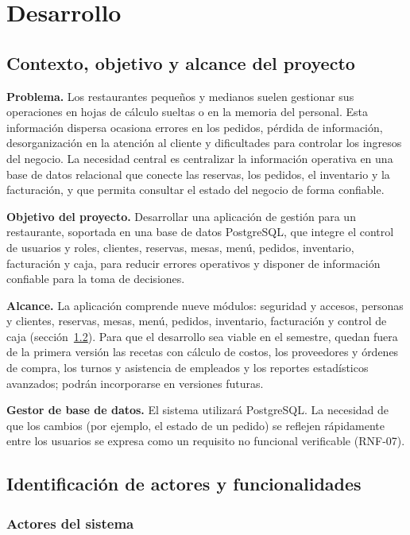 \documentclass[12pt,a4paper,oneside]{article}
\begin{document}
\section{Desarrollo}
\subsection{Contexto, objetivo y alcance del proyecto}

\textbf{Problema.} Los restaurantes pequeños y medianos suelen gestionar sus operaciones en hojas de cálculo sueltas o en la memoria del personal. Esta información dispersa ocasiona errores en los pedidos, pérdida de información, desorganización en la atención al cliente y dificultades para controlar los ingresos del negocio. La necesidad central es centralizar la información operativa en una base de datos relacional que conecte las reservas, los pedidos, el inventario y la facturación, y que permita consultar el estado del negocio de forma confiable.

\textbf{Objetivo del proyecto.} Desarrollar una aplicación de gestión para un restaurante, soportada en una base de datos PostgreSQL, que integre el control de usuarios y roles, clientes, reservas, mesas, menú, pedidos, inventario, facturación y caja, para reducir errores operativos y disponer de información confiable para la toma de decisiones.

\textbf{Alcance.} La aplicación comprende nueve módulos: seguridad y accesos, personas y clientes, reservas, mesas, menú, pedidos, inventario, facturación y control de caja (sección~\ref{sec:actores}). Para que el desarrollo sea viable en el semestre, quedan fuera de la primera versión las recetas con cálculo de costos, los proveedores y órdenes de compra, los turnos y asistencia de empleados y los reportes estadísticos avanzados; podrán incorporarse en versiones futuras.

\textbf{Gestor de base de datos.} El sistema utilizará PostgreSQL. La necesidad de que los cambios (por ejemplo, el estado de un pedido) se reflejen rápidamente entre los usuarios se expresa como un requisito no funcional verificable (RNF-07).

\subsection{Identificación de actores y funcionalidades}
\label{sec:actores}

\subsubsection{Actores del sistema}
\end{document}
